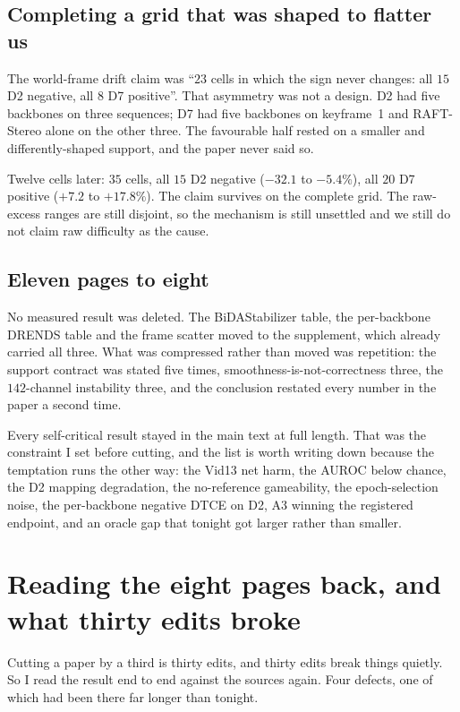 \documentclass[11pt,a4paper]{article}
\begin{document}
\subsection*{Completing a grid that was shaped to flatter us}

The world-frame drift claim was ``$23$ cells in which the sign never changes:
all $15$ D2 negative, all $8$ D7 positive''. That asymmetry was not a design.
D2 had five backbones on three sequences; D7 had five backbones on keyframe~1
and RAFT-Stereo alone on the other three. The favourable half rested on a
smaller and differently-shaped support, and the paper never said so.

Twelve cells later: $35$ cells, all $15$ D2 negative ($-32.1$ to $-5.4\%$), all
$20$ D7 positive ($+7.2$ to $+17.8\%$). The claim survives on the complete grid.
The raw-excess ranges are still disjoint, so the mechanism is still unsettled
and we still do not claim raw difficulty as the cause.

\subsection*{Eleven pages to eight}

No measured result was deleted. The BiDAStabilizer table, the per-backbone
DRENDS table and the frame scatter moved to the supplement, which already
carried all three. What was compressed rather than moved was repetition: the
support contract was stated five times, smoothness-is-not-correctness three,
the $142$-channel instability three, and the conclusion restated every number
in the paper a second time.

Every self-critical result stayed in the main text at full length. That was the
constraint I set before cutting, and the list is worth writing down because the
temptation runs the other way: the Vid13 net harm, the AUROC below chance, the
D2 mapping degradation, the no-reference gameability, the epoch-selection noise,
the per-backbone negative DTCE on D2, A3 winning the registered endpoint, and an
oracle gap that tonight got larger rather than smaller.


\section*{Reading the eight pages back, and what thirty edits broke}

Cutting a paper by a third is thirty edits, and thirty edits break things
quietly. So I read the result end to end against the sources again. Four
defects, one of which had been there far longer than tonight.
\end{document}

